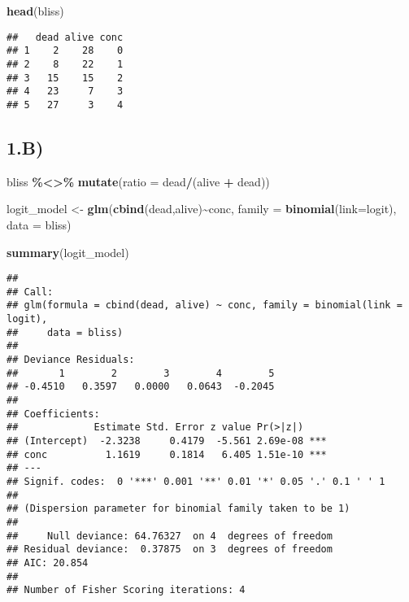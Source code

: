 \documentclass[
]{article}
\newenvironment{Shaded}{\begin{snugshade}}{\end{snugshade}}
\newcommand{\AttributeTok}[1]{\textcolor[rgb]{0.13,0.29,0.53}{#1}}
\newcommand{\FunctionTok}[1]{\textcolor[rgb]{0.13,0.29,0.53}{\textbf{#1}}}
\newcommand{\NormalTok}[1]{#1}
\newcommand{\OtherTok}[1]{\textcolor[rgb]{0.56,0.35,0.01}{#1}}
\newcommand{\SpecialCharTok}[1]{\textcolor[rgb]{0.81,0.36,0.00}{\textbf{#1}}}
\begin{document}
\begin{Shaded}
\begin{Highlighting}[]
\FunctionTok{head}\NormalTok{(bliss)}
\end{Highlighting}
\end{Shaded}

\begin{verbatim}
##   dead alive conc
## 1    2    28    0
## 2    8    22    1
## 3   15    15    2
## 4   23     7    3
## 5   27     3    4
\end{verbatim}

\subsection{1.B)}\label{b}

\begin{Shaded}
\begin{Highlighting}[]
\NormalTok{bliss }\SpecialCharTok{\%\textless{}\textgreater{}\%} \FunctionTok{mutate}\NormalTok{(}\AttributeTok{ratio =}\NormalTok{ dead}\SpecialCharTok{/}\NormalTok{(alive }\SpecialCharTok{+}\NormalTok{ dead))}


\NormalTok{logit\_model }\OtherTok{\textless{}{-}} \FunctionTok{glm}\NormalTok{(}\FunctionTok{cbind}\NormalTok{(dead,alive)}\SpecialCharTok{\textasciitilde{}}\NormalTok{conc, }\AttributeTok{family =} \FunctionTok{binomial}\NormalTok{(}\AttributeTok{link=}\NormalTok{logit), }\AttributeTok{data =}\NormalTok{ bliss)}

\FunctionTok{summary}\NormalTok{(logit\_model)}
\end{Highlighting}
\end{Shaded}

\begin{verbatim}
## 
## Call:
## glm(formula = cbind(dead, alive) ~ conc, family = binomial(link = logit), 
##     data = bliss)
## 
## Deviance Residuals: 
##       1        2        3        4        5  
## -0.4510   0.3597   0.0000   0.0643  -0.2045  
## 
## Coefficients:
##             Estimate Std. Error z value Pr(>|z|)    
## (Intercept)  -2.3238     0.4179  -5.561 2.69e-08 ***
## conc          1.1619     0.1814   6.405 1.51e-10 ***
## ---
## Signif. codes:  0 '***' 0.001 '**' 0.01 '*' 0.05 '.' 0.1 ' ' 1
## 
## (Dispersion parameter for binomial family taken to be 1)
## 
##     Null deviance: 64.76327  on 4  degrees of freedom
## Residual deviance:  0.37875  on 3  degrees of freedom
## AIC: 20.854
## 
## Number of Fisher Scoring iterations: 4
\end{verbatim}
\end{document}
